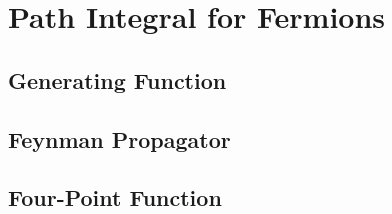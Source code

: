 \documentclass[12pt]{article}
\begin{document}
\section{Path Integral for Fermions}

\subsection{Generating Function}

\subsection{Feynman Propagator}

\subsection{Four-Point Function}
\end{document}
